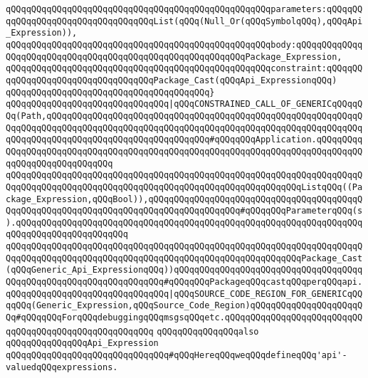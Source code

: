 \verb|qQQqqQQqqQQqqQQqqQQqqQQqqQQqqQQqqQQqqQQqqQQqqQQqqQQqparameters:qQQqqQQqqQQqqQQqqQQqqQQqqQQqqQQqqQQqList(qQQq(Null_Or(qQQqSymbolqQQq),qQQqApi_Expression)),|\newline
\verb|qQQqqQQqqQQqqQQqqQQqqQQqqQQqqQQqqQQqqQQqqQQqqQQqqQQqbody:qQQqqQQqqQQqqQQqqQQqqQQqqQQqqQQqqQQqqQQqqQQqqQQqqQQqqQQqqQQqPackage_Expression,|\newline
\verb|qQQqqQQqqQQqqQQqqQQqqQQqqQQqqQQqqQQqqQQqqQQqqQQqqQQqconstraint:qQQqqQQqqQQqqQQqqQQqqQQqqQQqqQQqqQQqPackage_Cast(qQQqApi_ExpressionqQQq)|\newline
\verb|qQQqqQQqqQQqqQQqqQQqqQQqqQQqqQQqqQQqqQQq}|\newline
\verb|qQQqqQQqqQQqqQQqqQQqqQQqqQQqqQQq|\verb#|qQQqCONSTRAINED_CALL_OF_GENERICqQQqqQQq(Path,qQQqqQQqqQQqqQQqqQQqqQQqqQQqqQQqqQQqqQQqqQQqqQQqqQQqqQQqqQQqqQQqqQQqqQQqqQQqqQQqqQQqqQQqqQQqqQQqqQQqqQQqqQQqqQQqqQQqqQQqqQQqqQQqqQQqqQQqqQQqqQQqqQQqqQQqqQQqqQQqqQQqqQQqqQQq#\verb|#qQQqqQQqApplication.qQQqqQQqqQQqqQQqqQQqqQQqqQQqqQQqqQQqqQQqqQQqqQQqqQQqqQQqqQQqqQQqqQQqqQQqqQQqqQQqqQQqqQQqqQQqqQQqqQQq|\newline
\verb|qQQqqQQqqQQqqQQqqQQqqQQqqQQqqQQqqQQqqQQqqQQqqQQqqQQqqQQqqQQqqQQqqQQqqQQqqQQqqQQqqQQqqQQqqQQqqQQqqQQqqQQqqQQqqQQqqQQqqQQqqQQqqQQqListqQQq((Package_Expression,qQQqBool)),qQQqqQQqqQQqqQQqqQQqqQQqqQQqqQQqqQQqqQQqqQQqqQQqqQQqqQQqqQQqqQQqqQQqqQQqqQQqqQQqqQQqqQQq#qQQqqQQqParameterqQQq(s).qQQqqQQqqQQqqQQqqQQqqQQqqQQqqQQqqQQqqQQqqQQqqQQqqQQqqQQqqQQqqQQqqQQqqQQqqQQqqQQqqQQqqQQqqQQq|\newline
\verb|qQQqqQQqqQQqqQQqqQQqqQQqqQQqqQQqqQQqqQQqqQQqqQQqqQQqqQQqqQQqqQQqqQQqqQQqqQQqqQQqqQQqqQQqqQQqqQQqqQQqqQQqqQQqqQQqqQQqqQQqqQQqqQQqPackage_Cast(qQQqGeneric_Api_ExpressionqQQq))qQQqqQQqqQQqqQQqqQQqqQQqqQQqqQQqqQQqqQQqqQQqqQQqqQQqqQQqqQQqqQQqqQQq#qQQqqQQqPackageqQQqcastqQQqperqQQqapi.|\newline
\verb|qQQqqQQqqQQqqQQqqQQqqQQqqQQqqQQq|\verb#|qQQqSOURCE_CODE_REGION_FOR_GENERICqQQqqQQq(Generic_Expression,qQQqSource_Code_Region)qQQqqQQqqQQqqQQqqQQqqQQq#\verb|#qQQqqQQqForqQQqdebuggingqQQqmsgsqQQqetc.qQQqqQQqqQQqqQQqqQQqqQQqqQQqqQQqqQQqqQQqqQQqqQQqqQQqqQQq|\newline
\newline
\newline
\newline
\verb|qQQqqQQqqQQqqQQqalso|\newline
\verb|qQQqqQQqqQQqqQQqApi_Expression|\newline
\newline
\verb|qQQqqQQqqQQqqQQqqQQqqQQqqQQqqQQq#qQQqHereqQQqweqQQqdefineqQQq'api'-valuedqQQqexpressions.|\newline
